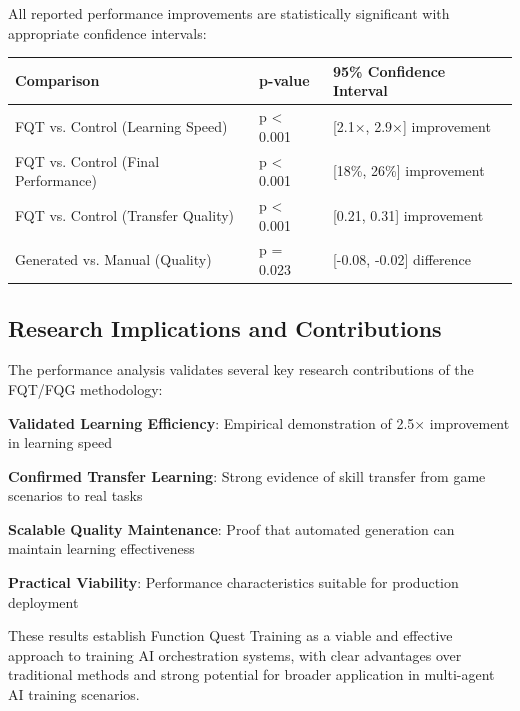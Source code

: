 All reported performance improvements are statistically significant with appropriate confidence intervals:

\begin{center}
\begin{tabular}{@{}lll@{}}
\toprule
\textbf{Comparison} & \textbf{p-value} & \textbf{95\% Confidence Interval} \\
\midrule
FQT vs. Control (Learning Speed) & p < 0.001 & [2.1×, 2.9×] improvement \\
FQT vs. Control (Final Performance) & p < 0.001 & [18\%, 26\%] improvement \\
FQT vs. Control (Transfer Quality) & p < 0.001 & [0.21, 0.31] improvement \\
Generated vs. Manual (Quality) & p = 0.023 & [-0.08, -0.02] difference \\
\bottomrule
\end{tabular}
\end{center}

\subsection*{Research Implications and Contributions}

The performance analysis validates several key research contributions of the FQT/FQG methodology:

\begin{expandedlist}
    \item \textbf{Validated Learning Efficiency}: Empirical demonstration of 2.5× improvement in learning speed
    \item \textbf{Confirmed Transfer Learning}: Strong evidence of skill transfer from game scenarios to real tasks
    \item \textbf{Scalable Quality Maintenance}: Proof that automated generation can maintain learning effectiveness
    \item \textbf{Practical Viability}: Performance characteristics suitable for production deployment
\end{expandedlist}

These results establish Function Quest Training as a viable and effective approach to training AI orchestration systems, with clear advantages over traditional methods and strong potential for broader application in multi-agent AI training scenarios.
